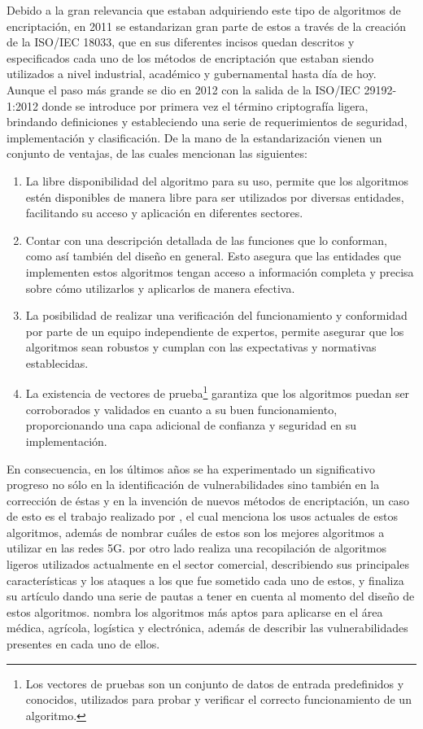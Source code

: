 \documentclass[a4paper,10pt]{article}
\begin{document}
	Debido a la gran relevancia que estaban adquiriendo este tipo de algoritmos de encriptación, en 2011 se estandarizan gran parte de estos a través de la creación de la ISO/IEC 18033, que en sus diferentes incisos quedan descritos y especificados cada uno de los métodos de encriptación que estaban siendo utilizados a nivel industrial, académico y gubernamental hasta día de hoy. Aunque el paso más grande se dio en 2012 con la salida de la ISO/IEC 29192-1:2012 donde se introduce por primera vez el término criptografía ligera, brindando definiciones y estableciendo una serie de requerimientos de seguridad, implementación y clasificación. De la mano de la estandarización vienen un conjunto de ventajas, de las cuales \textcite{eterovic15stream} mencionan las siguientes:
	\begin{enumerate}
		\item La libre disponibilidad del algoritmo para su uso, permite que los algoritmos estén disponibles de manera libre para ser utilizados por diversas entidades, facilitando su acceso y aplicación en diferentes sectores.
		\item Contar con una descripción detallada de las funciones que lo conforman, como así también del diseño en general. Esto asegura que las entidades que implementen estos algoritmos tengan acceso a información completa y precisa sobre cómo utilizarlos y aplicarlos de manera efectiva.
		\item La posibilidad de realizar una verificación del funcionamiento y conformidad por parte de un equipo independiente de expertos, permite asegurar que los algoritmos sean robustos y cumplan con las expectativas y normativas establecidas.
		\item La existencia de vectores de prueba\footnote{Los vectores de pruebas son un conjunto de datos de entrada predefinidos y conocidos, utilizados para probar y verificar el correcto funcionamiento de un algoritmo.} garantiza que los algoritmos puedan ser corroborados y validados en cuanto a su buen funcionamiento, proporcionando una capa adicional de confianza y seguridad en su implementación.
	\end{enumerate}
	En consecuencia, en los últimos años se ha experimentado un significativo progreso no sólo en la identificación de vulnerabilidades sino también en la corrección de éstas y en la invención de nuevos métodos de encriptación, un caso de esto es el trabajo realizado por \parencite{gunathilake2019next}, el cual menciona los usos actuales de estos algoritmos, además de nombrar cuáles de estos son los mejores algoritmos a utilizar en las redes 5G. \parencite{eterovic2019criptografia} por otro lado realiza una recopilación de algoritmos ligeros utilizados actualmente en el sector comercial, describiendo sus principales características y los ataques a los que fue sometido cada uno de estos, y finaliza su artículo dando una serie de pautas a tener en cuenta al momento del diseño de estos algoritmos. \parencite{thakor2020lightweight} nombra los algoritmos más aptos para aplicarse en el área médica, agrícola, logística y electrónica, además de describir las vulnerabilidades presentes en cada uno de ellos.
	
\end{document}

